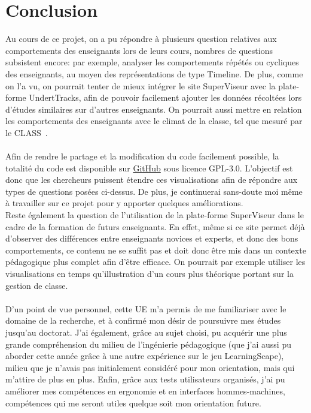 \documentclass{article}
\begin{document}
\section{Conclusion}
Au cours de ce projet, on a pu répondre à plusieurs question relatives aux comportements des enseignants lors de leurs cours, nombres de questions subsistent encore: par exemple, analyser les comportements répétés ou cycliques des enseignants, au moyen des représentations de type Timeline. De plus, comme on l'a vu, on pourrait tenter de mieux intégrer le site SuperViseur avec la plate-forme UndertTracks, afin de pouvoir facilement ajouter les données récoltées lors d'études similaires sur d'autres enseignants. On pourrait aussi mettre en relation les comportements des enseignants avec le climat de la classe, tel que mesuré par le CLASS~\cite{CLASS}.\\\\
Afin de rendre le partage et la modification du code facilement possible, la totalité du code est disponible sur \href{https://github.com/Vertmo/SuperViseur}{GitHub} sous licence GPL-3.0. L'objectif est donc que les chercheurs puissent étendre ces visualisations afin de répondre aux types de questions posées ci-dessus. De plus, je continuerai sans-doute moi même à travailler sur ce projet pour y apporter quelques améliorations.\\
Reste également la question de l'utilisation de la plate-forme SuperViseur dans le cadre de la formation de futurs enseignants. En effet, même si ce site permet déjà d'observer des différences entre enseignants novices et experts, et donc des bons comportements, ce contenu ne se suffit pas et doit donc être mis dans un contexte pédagogique plus complet afin d'être efficace. On pourrait par exemple utiliser les visualisations en temps qu'illustration d'un cours plus théorique portant sur la gestion de classe.\\\\
D'un point de vue personnel, cette UE m'a permis de me familiariser avec le domaine de la recherche, et à confirmé mon désir de poursuivre mes études jusqu'au doctorat. J'ai également, grâce au sujet choisi, pu acquérir une plus grande compréhension du milieu de l'ingénierie pédagogique (que j'ai aussi pu aborder cette année grâce à une autre expérience sur le jeu LearningScape), milieu que je n'avais pas initialement considéré pour mon orientation, mais qui m'attire de plus en plus. Enfin, grâce aux tests utilisateurs organisés, j'ai pu améliorer mes compétences en ergonomie et en interfaces hommes-machines, compétences qui me seront utiles quelque soit mon orientation future.
\end{document}
